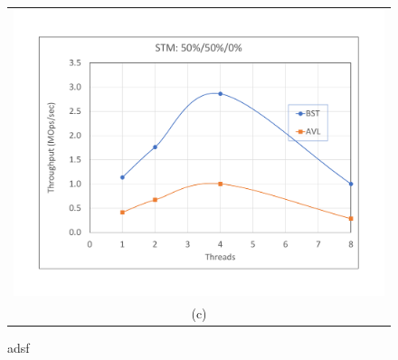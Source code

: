 \documentclass[conference]{IEEEtran}
\begin{document}
\begin{figure}[H]
\begin{tabular}{c}
\includegraphics[width =\linewidth]{figures/stm1-50-50-0} \\
(c) 
\end{tabular}
\caption{adsf}
\end{figure}
\end{document}
